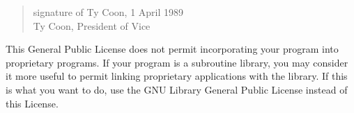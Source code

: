 \begin{lrbox}{\gpl}
\begin{minipage}{3\textwidth}
\begin{multicols}{3}
\begin{quote}
signature of Ty Coon, 1 April 1989 \\
Ty Coon, President of Vice
\end{quote}


This General Public License does not permit incorporating your program
into proprietary programs.  If your program is a subroutine library, you
may consider it more useful to permit linking proprietary applications
with the library.  If this is what you want to do, use the GNU Library
General Public License instead of this License.

\end{multicols}
\end{minipage}
\end{lrbox}

\begin{center}
\scalebox{0.33}{\usebox{\gpl}}
\end{center}

\endinput

